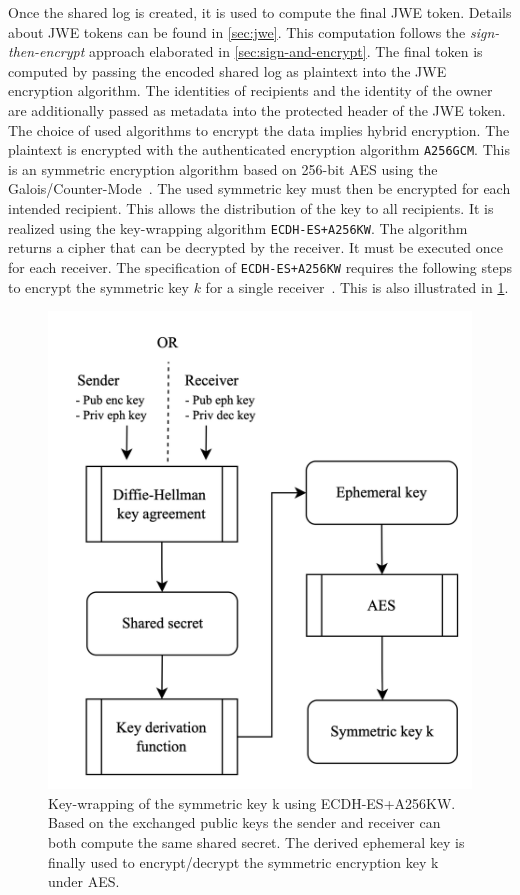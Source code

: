 \documentclass[../main.tex]{subfiles}
\begin{document}
Once the  shared log is created, it is used to compute the final JWE token.
Details about JWE tokens can be found in \cref{sec:jwe}.
This computation follows the \emph{sign-then-encrypt} approach elaborated in \cref{sec:sign-and-encrypt}.
The final token is computed by passing the encoded shared log as plaintext into the JWE encryption algorithm.
The identities of recipients and the identity of the owner are additionally passed as metadata into the protected header of the JWE token.
The choice of used algorithms to encrypt the data implies hybrid encryption.
The plaintext is encrypted with the authenticated encryption algorithm \verb|A256GCM|.
This is an symmetric encryption algorithm based on 256-bit AES using the Galois/Counter-Mode~\cite{JWA2015}.
The used symmetric key must then be encrypted for each intended recipient.
This allows the distribution of the key to all recipients.
It is realized using the key-wrapping algorithm \verb|ECDH-ES+A256KW|.
The algorithm returns a cipher that can be decrypted by the receiver.
It must be executed once for each receiver.
The specification of \verb|ECDH-ES+A256KW| requires the following steps to encrypt the symmetric key $k$ for a single receiver~\cite[100]{Barker2017}.
This is also illustrated in \cref{fig:key_wrapping}.
\begin{figure}[ht]
    \includegraphics[scale=0.2]{../img/05/key_wrapping.png}
    \centering
    \caption[Key-wrapping ECDH-ES+A256KW]{
        Key-wrapping of the symmetric key k using ECDH-ES+A256KW.
        Based on the exchanged public keys the sender and receiver can both compute the same shared secret.
        The derived ephemeral key is finally used to encrypt/decrypt the symmetric encryption key k under AES.}
    \label{fig:key_wrapping}
\end{figure}
\end{document}
